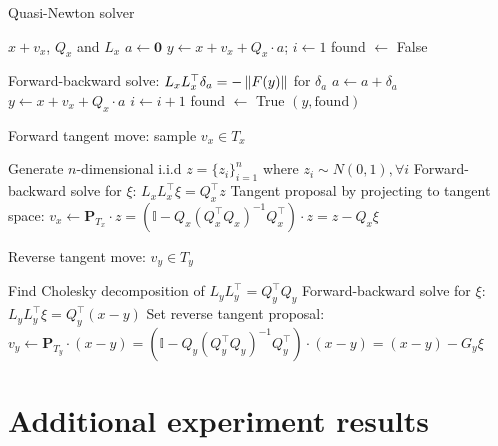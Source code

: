 \documentclass{article}
\begin{document}
\begin{algorithm}[H]
    \caption{Quasi-Newton solver}
    \label{algo:solver}
    \begin{algorithmic}
    \Require $x+v_x$, $Q_x$ and $L_x$
    \State $a \gets \mathbf{0}$
    \State $y \gets x+v_x + Q_x \cdot a$; 
    \State $i \gets 1$
    \State found $\gets$ False
    
         \State Forward-backward solve: $L_x L_x^\top \delta_a = -\left\lVert F(y)\right\rVert$ for $\delta_a$
         \State $a \gets a + \delta_a$ 
         \State $y \gets x+v_x + Q_x \cdot a$
         \State $i \gets i+1$
    \EndWhile
    \State found $\gets$ True
    \EndIf
    \State\Return $(y, \text{found})$
    
    \end{algorithmic}
\end{algorithm}


\begin{algorithm}[H]
    \caption{Forward tangent move: sample $v_x \in T_x$}
    \label{algo:forward tangent}
    \begin{algorithmic}
    \State Generate $n$-dimensional i.i.d $z = \{z_i\}_{i=1}^n$ where $z_i \sim N(0,1), \forall i$ 
    \State Forward-backward solve for $\xi$: $L_x L_x^\top \xi= Q_x^\top z$
    \State Tangent proposal by projecting to tangent space: $v_x \gets \mathbf{P}_{T_x} \cdot z = (\mathbb{I} - Q_x(Q_x^\top Q_x)^{-1} Q_x^\top) \cdot z = z - Q_x \xi$ 
    \end{algorithmic}
\end{algorithm}

\begin{algorithm}[H]
    \caption{Reverse tangent move: $v_y \in T_y$}
    \label{algo:reverse tangent}
    \begin{algorithmic}
    \State Find Cholesky decomposition of $L_y L_y^\top = Q_y^\top Q_y$
    \State Forward-backward solve for $\xi$: $L_y L_y^\top \xi= Q_y^\top (x-y)$
    \State Set reverse tangent proposal: $v_y \gets \mathbf{P}_{T_y} \cdot (x-y) = (\mathbb{I} - Q_y(Q_y^\top Q_y)^{-1} Q_y^\top) \cdot (x-y) = (x-y) - G_y \xi$
    \end{algorithmic}
\end{algorithm}

\section{Additional experiment results}
\end{document}

